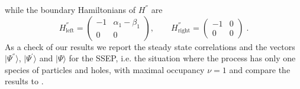 \documentclass[10pt]{article}
\numberwithin{equation}{section}
\numberwithin{equation}{subsection}
\newcommand{\dt}{\;.}
\begin{document}
while the boundary Hamiltonians of $H^{''}$ are
\begin{equation}
	H^{''}_{\text{left}}=\begin{pmatrix}
		-1&\alpha_{1}-\beta_{1}\\
		0&0
	\end{pmatrix},\qquad H^{''}_{\text{right}}=\begin{pmatrix}
	-1&0\\
	0&0
\end{pmatrix}\dt
\end{equation}
{\color{blue}As a check of our results we report the steady state correlations and the vectors $|\Psi^{''}\rangle$, $|\Psi^{'}\rangle$ and $|\Psi\rangle$ for the SSEP, i.e. the situation where the process has only one species of particles and holes, with maximal occupancy $\nu=1$ and compare the results to \cite{frassek2020eigenstates}. }
\end{document}
